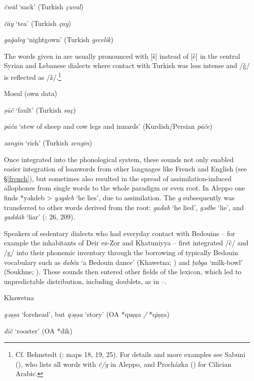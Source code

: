 \documentclass[output=paper]{langsci/langscibook}
\begin{document}
\textit{čwāl} ‘sack’ (Turkish \textit{çuval})

\textit{čāy} ‘tea’ (Turkish \textit{çay})

\textit{gaǧaleg} ‘nightgown’ (Turkish \textit{gecelik})
\z

The words given in  are usually pronounced with [š] instead of [č] in the central Syrian and Lebanese dialects where contact with Turkish was less intense and /ǧ/ is reflected as /ž/.\footnote{Cf. Behnstedt (\citeyear{Behnstedt1997}: maps 18, 19, 25). For details and more examples see Sabuni (\citeyear[205--210]{Sabuni1980}), who lists all words with \textit{č/g} in Aleppo, and Procházka (\citeyear[185]{Procházka2002Adana}) for Cilician Arabic.}

\ea\label{Mosul}
Mosul (own data)

\textit{ṣūč} ‘fault’ (Turkish \textit{suç})

\textit{pāča} ‘stew of sheep and cow legs and innards’ (Kurdish/Persian \textit{pāče})

\textit{zangīn} ‘rich’ (Turkish \textit{zengin})
\z

Once integrated into the phonological system, these sounds not only enabled easier integration of loanwords from other languages like French and English (see §\ref{french}), but sometimes also resulted in the spread of assimilation-induced allophones from single words to the whole paradigm or even root. In Aleppo one finds *yəkdeb > \textit{yəgdeb} ‘he lies’, due to assimilation. The \textit{g} subsequently was transferred to other words derived from the root: \textit{gadab} ‘he lied’, \textit{gədbe} ‘lie’, and \textit{gaddāb} ‘liar’ (\citealt{Sabuni1980}: 26, 209). 

Speakers of sedentary dialects who had everyday contact with Bedouins – for example the inhabitants of Deir ez-Zor and Khatuniyya – first integrated /č/ and /g/ into their phonemic inventory through the borrowing of typically Bedouin vocabulary such as \textit{dabča} ‘a Bedouin dance’ (Khawetna; \citealt[29]{Talay1999}) and \textit{ṭabga} ‘milk-bowl’ (Soukhne; \citealt[310]{Behnstedt1994Soukhne}). These sounds then entered other fields of the lexicon, which led to unpredictable distribution, including doublets, as in --.

\ea\label{Khawetna} Khawetna \citep[28--31]{Talay1999}  

\textit{gəṣṣa} ‘forehead’, but \textit{qəṣṣa} ‘story’ (OA *quṣṣa \textit{/} *qiṣṣa)

\textit{dīč} ‘rooster’  (OA *dīk)
\z
\end{document}
